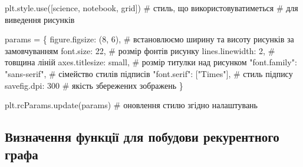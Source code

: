 \documentclass[
  letterpaper,
]{report}
\newenvironment{Shaded}{\begin{snugshade}}{\end{snugshade}}
\newcommand{\CommentTok}[1]{\textcolor[rgb]{0.37,0.37,0.37}{#1}}
\newcommand{\DecValTok}[1]{\textcolor[rgb]{0.68,0.00,0.00}{#1}}
\newcommand{\NormalTok}[1]{\textcolor[rgb]{0.00,0.23,0.31}{#1}}
\newcommand{\OperatorTok}[1]{\textcolor[rgb]{0.37,0.37,0.37}{#1}}
\newcommand{\StringTok}[1]{\textcolor[rgb]{0.13,0.47,0.30}{#1}}
\begin{document}
\begin{Shaded}
\begin{Highlighting}[]
\NormalTok{plt.style.use([}\StringTok{\textquotesingle{}science\textquotesingle{}}\NormalTok{, }\StringTok{\textquotesingle{}notebook\textquotesingle{}}\NormalTok{, }\StringTok{\textquotesingle{}grid\textquotesingle{}}\NormalTok{]) }\CommentTok{\# стиль, що використовуватиметься}
                                               \CommentTok{\# для виведення рисунків}

\NormalTok{params }\OperatorTok{=}\NormalTok{ \{}
    \StringTok{\textquotesingle{}figure.figsize\textquotesingle{}}\NormalTok{: (}\DecValTok{8}\NormalTok{, }\DecValTok{6}\NormalTok{),         }\CommentTok{\# встановлюємо ширину та висоту рисунків за замовчуванням}
    \StringTok{\textquotesingle{}font.size\textquotesingle{}}\NormalTok{: }\DecValTok{22}\NormalTok{,                  }\CommentTok{\# розмір фонтів рисунку}
    \StringTok{\textquotesingle{}lines.linewidth\textquotesingle{}}\NormalTok{: }\DecValTok{2}\NormalTok{,             }\CommentTok{\# товщина ліній}
    \StringTok{\textquotesingle{}axes.titlesize\textquotesingle{}}\NormalTok{: }\StringTok{\textquotesingle{}small\textquotesingle{}}\NormalTok{,        }\CommentTok{\# розмір титулки над рисунком}
    \StringTok{"font.family"}\NormalTok{: }\StringTok{"sans{-}serif"}\NormalTok{,      }\CommentTok{\# сімейство стилів підписів }
    \StringTok{"font.serif"}\NormalTok{: [}\StringTok{"Times"}\NormalTok{],          }\CommentTok{\# стиль підпису}
    \StringTok{\textquotesingle{}savefig.dpi\textquotesingle{}}\NormalTok{: }\DecValTok{300}                \CommentTok{\# якість збережених зображень}
\NormalTok{\}}

\NormalTok{plt.rcParams.update(params)           }\CommentTok{\# оновлення стилю згідно налаштувань}
\end{Highlighting}
\end{Shaded}

\hypertarget{ux432ux438ux437ux43dux430ux447ux435ux43dux43dux44f-ux444ux443ux43dux43aux446ux456ux457-ux434ux43bux44f-ux43fux43eux431ux443ux434ux43eux432ux438-ux440ux435ux43aux443ux440ux435ux43dux442ux43dux43eux433ux43e-ux433ux440ux430ux444ux430}{%
\subsection{Визначення функції для побудови рекурентного
графа}\label{ux432ux438ux437ux43dux430ux447ux435ux43dux43dux44f-ux444ux443ux43dux43aux446ux456ux457-ux434ux43bux44f-ux43fux43eux431ux443ux434ux43eux432ux438-ux440ux435ux43aux443ux440ux435ux43dux442ux43dux43eux433ux43e-ux433ux440ux430ux444ux430}}
\end{document}
